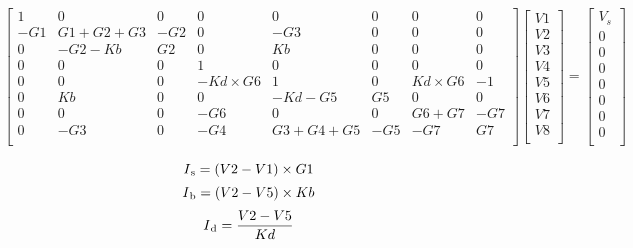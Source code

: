 \hspace{-35mm}
\begin{gather}
    \begin{bmatrix}
    1    &   0       & 0     &   0 & 0   & 0 & 0 & 0 \\
    -G1  &  G1+G2+G3 & -G2   &   0 & -G3 & 0 & 0 & 0 \\
    0    &   -G2-Kb  & G2    &   0 & Kb  &0  & 0 & 0 \\   
    0    &   0       & 0     &   1 & 0   & 0 & 0 & 0 \\
    0    &   0       & 0     & -Kd \times G6 & 1 & 0 & Kd\times G6 & -1 \\
    0    &   Kb      & 0     &   0 &  -Kd-G5 & G5 & 0 & 0  \\
    0    &   0       & 0     & -G6 & 0 & 0 & G6+G7 & -G7  \\
    0    &  -G3      & 0     & -G4 & G3+G4+G5 & -G5 & -G7 &  G7 \\
    \end{bmatrix}
    \begin{bmatrix}
    V1     \\
    V2     \\
    V3     \\
    V4     \\
    V5     \\
    V6     \\
    V7     \\
    V8     \\
    \end{bmatrix}
    =
    \begin{bmatrix}
    V_s    \\
    0      \\
    0      \\
    0      \\
    0      \\
    0      \\
    0      \\
    0      \\
    \end{bmatrix}
\end{gather}

\begin{equation}
I\textsubscript{s} = (V2 - V1) \times G1 
\end{equation}
\begin{equation}
I\textsubscript{b} = (V2 - V5) \times Kb 
\end{equation}
\begin{equation}
I\textsubscript{d} = \frac{V2 - V5}{Kd} 
\end{equation}

